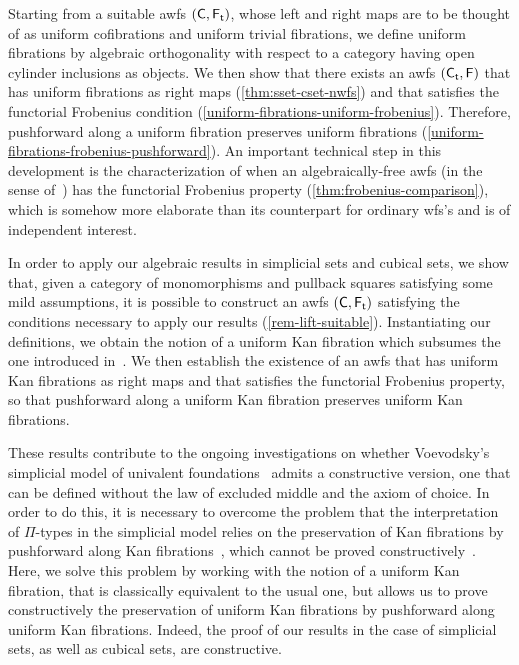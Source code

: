 \documentclass[reqno,10pt,a4paper,oneside,draft]{amsart}
\begin{document}
Starting from a suitable awfs $(\mathsf{C}, \mathsf{F_t})$, whose left and right maps are to be thought of as uniform cofibrations and uniform trivial fibrations, we define uniform fibrations by algebraic orthogonality with respect to a category having open cylinder inclusions as objects.
We then show that there exists an awfs $(\mathsf{C_t}, \mathsf{F})$ that has uniform fibrations as right maps (\cref{thm:sset-cset-nwfs}) and that satisfies the functorial Frobenius condition (\cref{uniform-fibrations-uniform-frobenius}).
Therefore, pushforward along a uniform fibration preserves uniform fibrations (\cref{uniform-fibrations-frobenius-pushforward}).
An important technical step in this development is the characterization of when an algebraically-free awfs (in the sense of~\cite{garner:small-object-argument}) has the functorial Frobenius property (\cref{thm:frobenius-comparison}), which is somehow more elaborate than its counterpart for ordinary wfs's and is of independent interest.

In order to apply our algebraic results in simplicial sets and cubical sets, we show that, given a category of monomorphisms and pullback squares satisfying some mild assumptions, it is possible to construct an awfs $(\mathsf{C}, \mathsf{F_t})$ satisfying the conditions necessary to apply our results (\cref{rem-lift-suitable}).
Instantiating our definitions, we obtain the notion of a uniform Kan fibration which subsumes the one introduced in~\cite{cohen-et-al:cubicaltt}.
We then establish the existence of an awfs that has uniform Kan fibrations as right maps and that satisfies the functorial Frobenius property, so that pushforward along a uniform Kan fibration preserves uniform Kan fibrations.


These results contribute to the ongoing investigations on whether Voevodsky's simplicial model of univalent foundations~\cite{voevodsky-simplicial-model} admits a constructive version, \ie one that can be defined without the law of excluded middle and the axiom of choice. In order to do this, it is necessary to overcome the problem that the interpretation of
$\Pi$-types in the simplicial model relies on the preservation of Kan fibrations by pushforward along Kan fibrations~\cite[Lemma~2.3.1]{voevodsky-simplicial-model}, which cannot be proved constructively~\cite[Section~6]{coquand-non-constructivity-kan}. Here, we solve this problem by working with the notion of a uniform Kan fibration, that is classically equivalent to the usual one, but allows us to prove constructively the preservation of uniform Kan fibrations by pushforward along uniform Kan fibrations. Indeed, the proof of our results in  the case of simplicial sets, as well as cubical sets, are constructive. 
\end{document}
